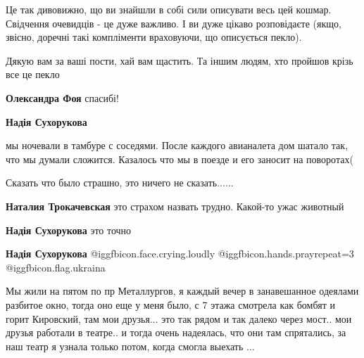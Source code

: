  
 
 
 
 
\qqSecCmt

\begin{itemize} %

Це так дивовижно, що ви знайшли в собі сили описувати весь цей кошмар.
Свідчення очевидців - це дуже важливо. І ви дуже цікаво розповідаєте (якщо,
звісно, доречні такі компліменти враховуючи, що описується пекло).

Дякую вам за ваші пости, хай вам щастить. Та іншим людям, хто пройшов крізь все
це пекло

\begin{itemize} %
\textbf{Олександра Фоя} спасибі!

\textbf{Надія Сухорукова} 

мы ночевали в тамбуре с соседями. После каждого авианалета дом шатало так, что
мы думали сложится. Казалось что мы в поезде и его заносит на поворотах(

Сказать что было страшно, это ничего не сказать......

\textbf{Наталия Трокачевская} это страхом назвать трудно. Какой-то ужас животный

\textbf{Надія Сухорукова} это точно

\textbf{Надія Сухорукова}  @igg{fbicon.face.crying.loudly}  @igg{fbicon.hands.pray}{repeat=3}  @igg{fbicon.flag.ukraina}

\end{itemize} %


Мы жили на пятом по пр Металлургов, я каждый вечер в занавешанное одеялами
разбитое окно, тогда оно еще у меня было, с 7 этажа смотрела как бомбят и горит
Кировский, там мои друзья... это так рядом и так далеко через мост.. мои друзья
работали в театре.. и тогда очень надеялась, что они там спрятались, за наш
театр я узнала только потом, когда смогла выехать ...



\end{itemize}
